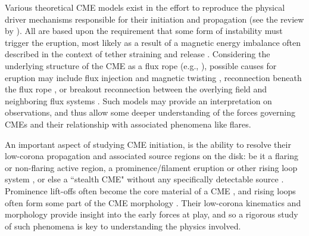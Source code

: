 \documentclass[namedreferences]{solarphysics}
\begin{document}
\begin{article}
Various theoretical CME models exist in the effort to reproduce the physical driver mechanisms responsible for their initiation and propagation (see the review by ). All are based upon the requirement that some form of instability must trigger the eruption, most likely as a result of a magnetic energy imbalance often described in the context of tether straining and release \cite{2001AGUGM.125..143K}. Considering the underlying structure of the CME as a flux rope (e.g., ), possible causes for eruption may include flux injection and magnetic twisting \cite{2006PhRvL..96y5002K,2001ApJ...562.1045K}, reconnection beneath the flux rope \cite{2007ApJ...658L.123L,2003ApJ...595.1231A}, or breakout reconnection between the overlying field and neighboring flux systems \cite{2008ApJ...683.1192L,2007ApJ...671L..77V}. Such models may provide an interpretation on observations, and thus allow some deeper understanding of the forces governing CMEs and their relationship with associated phenomena like flares.



An important aspect of studying CME initiation, is the ability to resolve their low-corona propagation and associated source regions on the disk: be it a flaring or non-flaring active region, a prominence/filament eruption or other rising loop system \cite{2002ApJ...566L.117Z,2001ApJ...561..372S}, or else a ``stealth CME" without any specifically detectable source \cite{2013SoPh..285..269H}. Prominence lift-offs often become the core material of a CME \cite{2008AnGeo..26.3025F,2003ApJ...586..562G}, and rising loops often form some part of the CME morphology \cite{2006A&A...455..339D,2004A&A...422..307C}. Their low-corona kinematics and morphology provide insight into the early forces at play, and so a rigorous study of such phenomena is key to understanding the physics involved.


\end{article}
\end{document}
